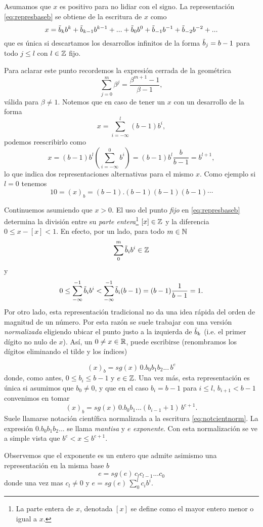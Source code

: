 Asumamos que $x$ es positivo para no lidiar con el signo. La representación \eqref{eq:represbaseb} se obtiene de la escritura de $x$ como
$$
x=\tilde b_kb^k+\tilde b_{k-1}b^{k-1}+...+\tilde b_0b^0+\tilde b_{-1}b^{-1}+\tilde b_{-2}b^{-2}+...
$$
 que es única si  descartamos los desarrollos infinitos de la forma $\tilde b_j=b-1$ para todo $j\le l$ con $l\in \mathbb Z$ fijo.

 Para aclarar este punto recordemos la expresión  cerrada de la geométrica
$$
\sum_{j=0}^m\beta^j=\frac{\beta^{m+1}-1}{\beta -1},
$$
 válida para $\beta\neq 1$. Notemos que  en caso de tener un $x$ con un desarrollo de la forma
$$
x=\sum_{i=-\infty}^l(b-1)b^i,
$$
podemos reescribirlo como
$$
x=(b-1)b^{l}
\left(\sum_{i=-\infty}^0b^i\right)=(b-1)b^l\frac{b}{b-1}=b^{l+1},
$$
lo que indica dos  representaciones alternativas para el mismo $x$. Como ejemplo si  $l=0$ tenemos
$$
10=(x)_b=(b-1).(b-1)(b-1)(b-1)\cdots
$$

Continuemos asumiendo que $x>0$. El uso del punto \emph{fijo} en  \eqref{eq:represbaseb}  determina la división entre su \emph{parte entera}\footnote{La parte entera de $x$, denotada $[x]$ se define como el mayor entero menor o igual a $x$.}  $[x]\in \mathbb Z$ y la diferencia $0\le x-[x]<1$. En efecto, por un lado, para todo $m\in \mathbb N$
$$\sum_{0}^m\tilde b_i b^i\in \mathbb Z$$
y
$$
0\le \sum_{-\infty}^{-1}\tilde b_ib^{i}<\sum_{-\infty}^{-1}\tilde b_i(b-1)=(b-1)\frac{1}{b-1}=1.
$$
Por otro lado, esta representación tradicional no da una idea rápida del orden de magnitud
de un número. Por esta razón se suele trabajar con una versión \emph{normalizada}  eligiendo ubicar el punto justo a la izquierda de $\tilde b_k$ (i.e. el primer dígito no nulo de $x$). Así, un $0\neq x\in \mathbb R$, puede escribirse (renombramos los dígitos eliminando el tilde y los índices)

\begin{equation}
 \label{eq:notcientnorm}
(x)_b=sg(x) \, 0.b_0b_1b_2...\, b^{e}
\end{equation}
donde, como antes, $0\le b_i\le b-1$ y $e\in \mathbb Z$.
Una vez más, esta representación es única si asumimos que $b_0\neq 0$, y que en el caso $b_i=b-1$ para $i\le l$, $b_{i+1}<b-1$
convenimos en tomar
$$
(x)_b=sg(x)\, 0.b_0b_1...(b_{i-1}+1)\, b^{e+1}.
$$
Suele llamarse notación científica normalizada a la escritura \eqref{eq:notcientnorm}. La expresión  $0.b_0b_1b_2...$ se llama \emph{mantisa} y $e$  \emph{exponente}. Con esta normalización se ve a simple vista que $b^e< x\le b^{e+1}$.

Observemos que el exponente es un entero que admite asimismo una representación en la misma base $b$
$$e=sg(e)\, c_lc_{l-1}...c_{0}$$
donde una vez mas $c_l\neq 0$ y
$e=sg(e)\, \sum_0^{l}c_ib^i$.

